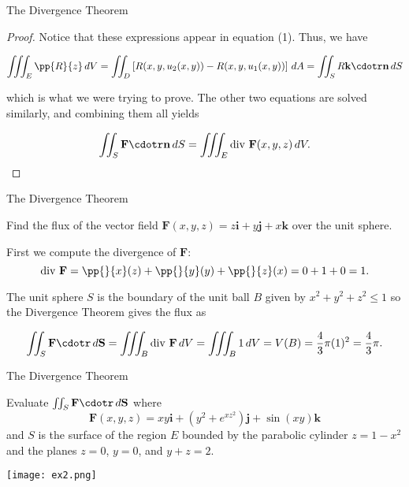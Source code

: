 \documentclass[11pt,english,
handout
]{beamer}
\begin{document}
\begin{frame}[t]{The Divergence Theorem}
\small
\begin{proof}
Notice that these expressions appear in equation (1). Thus, we have

\[
\iiint_E\pp{R}{z}\,dV=\iint_D\left[R(x,y,u_2(x,y))-R(x,y,u_1(x,y))\right]\,dA=\iint_SR\mathbf{k}\cdotr\mathbf{n}\,dS
\]

which is what we were trying to prove. \pause The other two equations are solved similarly, and combining them all yields

\[
\iint_S\mathbf{F}\cdotr\mathbf{n}\,dS=\iiint_E\text{div }\mathbf{F}(x,y,z)\,dV.
\]
\end{proof}
\end{frame}















\begin{frame}[t]{The Divergence Theorem}
\small
\begin{example}
Find the flux of the vector field $\mathbf{F}(x,y,z)=z\mathbf{i}+y\mathbf{j}+x\mathbf{k}$ over the unit sphere.\pause 

\lspace
First we compute the divergence of $\mathbf{F}$:
\[
\text{div }\mathbf{F}=\pp{}{x}(z)+\pp{}{y}(y)+\pp{}{z}(x)=0+1+0=1.
\]\pause

The unit sphere $S$ is the boundary of the unit ball $B$ given by $x^2+y^2+z^2\leq 1$ so the Divergence Theorem gives the flux as

\lspace
\[
\iint_S\mathbf{F}\cdotr\,d\mathbf{S}=\iiint_B\text{div }\mathbf{F}\,dV=\iiint_B1\,dV=V(B)=\frac{4}{3}\pi(1)^2=\frac{4}{3}\pi.
\]
\end{example}
\end{frame}










\begin{frame}[t]{The Divergence Theorem}
\small
\begin{example}
Evaluate $\iint_S\mathbf{F}\cdotr\,d\mathbf{S}$ where
\[
\mathbf{F}(x,y,z)=xy\mathbf{i}+(y^2+e^{xz^2})\mathbf{j}+\sin(xy)\mathbf{k}
\]
and $S$ is the surface of the region $E$ bounded by the parabolic cylinder $z=1-x^2$ and the planes $z=0$, $y=0$, and $y+z=2$.

\begin{center}
\texttt{[image: ex2.png]}
\end{center}
\end{example}
\end{frame}
\end{document}

